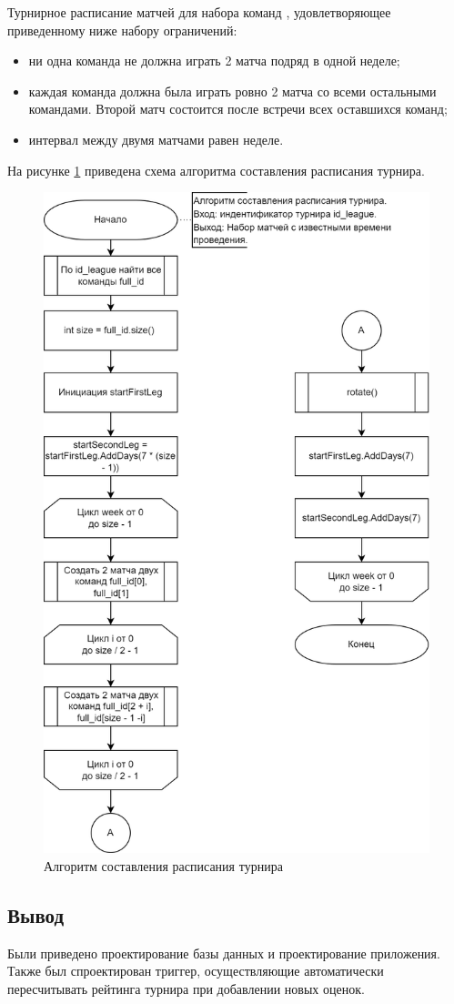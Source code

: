 Турнирное расписание матчей для набора команд , удовлетворяющее приведенному ниже набору ограничений:
\begin{itemize}
	\item ни одна команда не должна играть 2 матча подряд в одной неделе;
	\item каждая команда должна была играть ровно 2 матча со всеми остальными командами. Второй матч состоится после встречи всех оставшихся команд;
	\item интервал между двумя матчами равен неделе.
\end{itemize}

На рисунке \ref{img:schedule} приведена схема алгоритма составления расписания турнира.

\begin{figure}[h]
	\centering
	\includegraphics[height=0.45\textheight]{img/schedule.png}
	\caption{Алгоритм составления расписания турнира}
	\label{img:schedule}
\end{figure}
\clearpage

\subsection*{Вывод}
Были приведено проектирование базы данных и проектирование приложения.
Также был спроектирован триггер, осуществляющие автоматически пересчитывать рейтинга турнира при добавлении новых оценок.